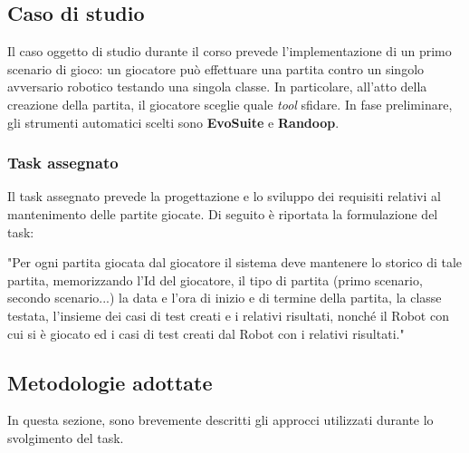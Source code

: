 \documentclass{article}
\begin{document}
\subsection{Caso di studio}
Il caso oggetto di studio durante il corso prevede l'implementazione di un primo scenario di gioco: un giocatore può effettuare una partita contro un singolo avversario robotico testando una singola classe. In particolare, all'atto della creazione della partita, il giocatore sceglie quale \textit{tool} sfidare. In fase preliminare, gli strumenti automatici scelti sono \textbf{EvoSuite} e \textbf{Randoop}.

\subsubsection{Task assegnato}
Il task assegnato prevede la progettazione e lo sviluppo dei requisiti relativi al mantenimento delle partite giocate. Di seguito è riportata la formulazione del task: 

"Per ogni partita giocata dal giocatore il sistema deve mantenere lo storico di tale partita, memorizzando l’Id del giocatore, il tipo di partita (primo scenario, secondo scenario...) la data e l’ora di inizio e di termine della partita, la classe testata, l’insieme dei casi di test creati e i relativi risultati, nonché il Robot con cui si è giocato ed i casi di test creati dal Robot con i relativi risultati."

\subsection{Metodologie adottate}
In questa sezione, sono brevemente descritti gli approcci utilizzati durante lo svolgimento del task.
\end{document}
